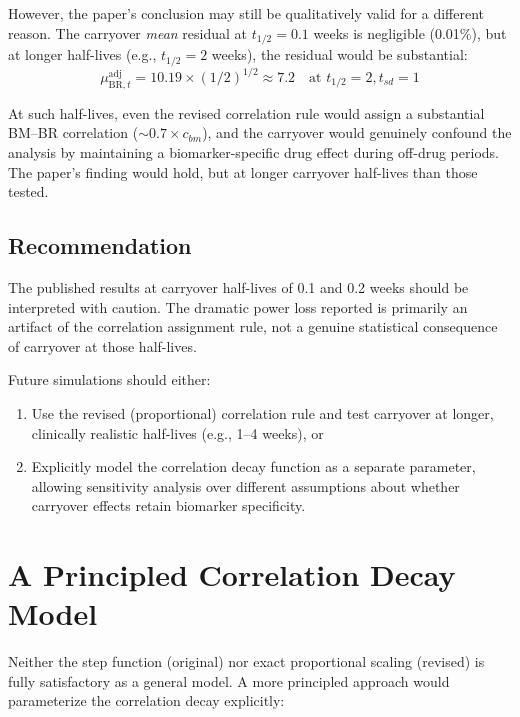 \documentclass[11pt]{article}
\begin{document}
However, the paper's conclusion may still be qualitatively
valid for a different reason. The carryover \emph{mean}
residual at $t_{1/2} = 0.1$ weeks is negligible (0.01\%),
but at longer half-lives (e.g., $t_{1/2} = 2$ weeks), the
residual would be substantial:
\[
\mu_{\text{BR},t}^{\text{adj}} =
  10.19 \times (1/2)^{1/2} \approx 7.2
  \quad\text{at } t_{1/2} = 2, t_{sd} = 1
\]

At such half-lives, even the revised correlation rule would
assign a substantial BM--BR correlation ($\sim 0.7 \times
c_{bm}$), and the carryover would genuinely confound the
analysis by maintaining a biomarker-specific drug effect
during off-drug periods. The paper's finding would hold, but
at longer carryover half-lives than those tested.

\subsection{Recommendation}

The published results at carryover half-lives of 0.1 and 0.2
weeks should be interpreted with caution. The dramatic power
loss reported is primarily an artifact of the correlation
assignment rule, not a genuine statistical consequence of
carryover at those half-lives.

Future simulations should either:

\begin{enumerate}
\item Use the revised (proportional) correlation rule and
  test carryover at longer, clinically realistic half-lives
  (e.g., 1--4 weeks), or
\item Explicitly model the correlation decay function as a
  separate parameter, allowing sensitivity analysis over
  different assumptions about whether carryover effects
  retain biomarker specificity.
\end{enumerate}

\section{A Principled Correlation Decay Model}

Neither the step function (original) nor exact proportional
scaling (revised) is fully satisfactory as a general model.
A more principled approach would parameterize the correlation
decay explicitly:
\end{document}
